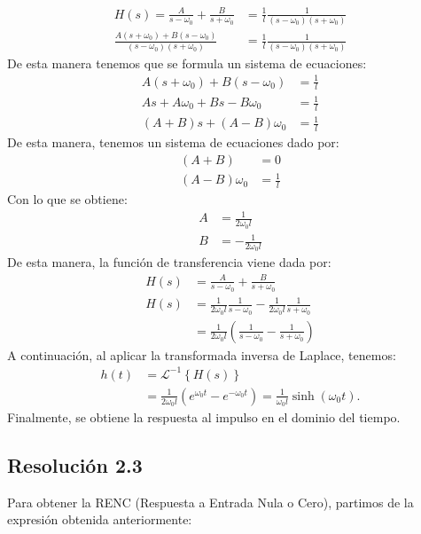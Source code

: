 \documentclass[
  11pt,
  letterpaper,
   addpoints,
   answers
  ]{exam}
\begin{document}
\begin{questions}
\begin{solution}
\begin{align}
    H(s) = \frac{A}{s - \omega_0} + \frac{B}{s + \omega_0} &= \frac{1}{l} \frac{1}{(s - \omega_0)(s + \omega_0)}\\
    \frac{A(s+\omega_{0}) + B(s-\omega_{0})}{(s - \omega_0)(s + \omega_0)} &= \frac{1}{l} \frac{1}{(s - \omega_0)(s + \omega_0)}
\end{align}
De esta manera tenemos que se formula un sistema de ecuaciones:
\begin{align}
    A(s+\omega_{0}) + B(s-\omega_{0}) &= \frac{1}{l}\\
    As + A\omega_{0} + Bs - B\omega_{0} &= \frac{1}{l}\\
    (A + B)s + (A - B)\omega_{0} &= \frac{1}{l}
\end{align}
De esta manera, tenemos un sistema de ecuaciones dado por:
\begin{align}
    (A + B) &= 0\\
    (A - B)\omega_{0} &= \frac{1}{l}
\end{align}
Con lo que se obtiene:
\begin{align}
    A &= \frac{1}{2\omega_0 l}\\
    B &= -\frac{1}{2\omega_0 l}
\end{align}
De esta manera, la función de transferencia viene dada por:
\begin{align}
    H(s) &= \frac{A}{s - \omega_0} + \frac{B}{s + \omega_0} \\
    H(s) &= \frac{1}{2\omega_0 l} \frac{1}{s - \omega_0} - \frac{1}{2\omega_0 l} \frac{1}{s + \omega_0} \\
    &= \frac{1}{2\omega_0 l} \left( \frac{1}{s - \omega_0} - \frac{1}{s + \omega_0} \right)
\end{align}
A continuación, al aplicar la transformada inversa de Laplace, tenemos:
\begin{align}
    h(t) &= \mathcal{L}^{-1}\left\{ H(s) \right\} \\
    &= \frac{1}{2\omega_0 l} \left( e^{\omega_0 t} - e^{-\omega_0 t} \right) = \frac{1}{\omega_0 l} \sinh(\omega_0 t).
\end{align}
Finalmente, se obtiene la respuesta al impulso en el dominio del tiempo.

\subsection*{Resolución 2.3}
Para obtener la RENC (Respuesta a Entrada Nula o Cero), partimos de la expresión obtenida anteriormente:


\end{solution}
\end{questions}
\end{document}
